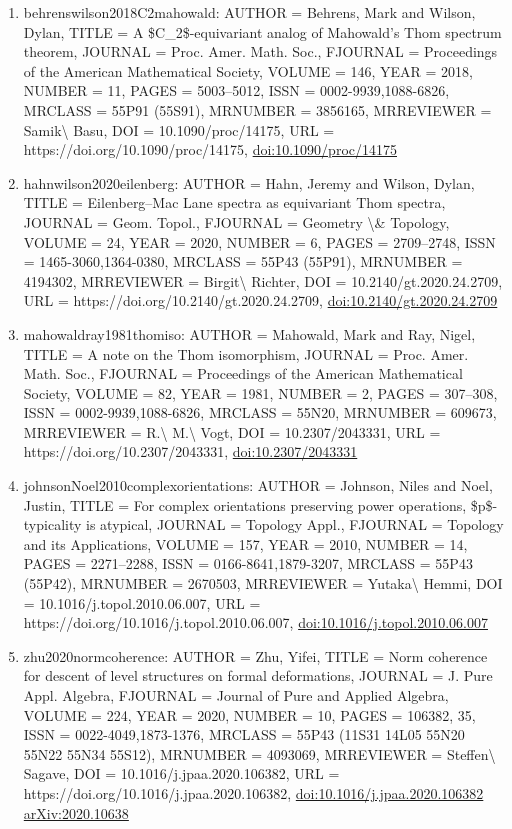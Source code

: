 \documentclass[11pt]{article}
\begin{document}
\begin{enumerate}[leftmargin=*]
  \item behrenswilson2018C2mahowald: AUTHOR = Behrens, Mark and Wilson, Dylan, TITLE = A \$C\_2\$-equivariant analog of Mahowald's Thom spectrum theorem, JOURNAL = Proc. Amer. Math. Soc., FJOURNAL = Proceedings of the American Mathematical Society, VOLUME = 146, YEAR = 2018, NUMBER = 11, PAGES = 5003--5012, ISSN = 0002-9939,1088-6826, MRCLASS = 55P91 (55S91), MRNUMBER = 3856165, MRREVIEWER = Samik\textbackslash{} Basu, DOI = 10.1090/proc/14175, URL = https://doi.org/10.1090/proc/14175, \href{https://doi.org/10.1090/proc/14175}{doi:10.1090/proc/14175}
  \item hahnwilson2020eilenberg: AUTHOR = Hahn, Jeremy and Wilson, Dylan, TITLE = Eilenberg--Mac Lane spectra as equivariant Thom spectra, JOURNAL = Geom. Topol., FJOURNAL = Geometry \textbackslash{}\& Topology, VOLUME = 24, YEAR = 2020, NUMBER = 6, PAGES = 2709--2748, ISSN = 1465-3060,1364-0380, MRCLASS = 55P43 (55P91), MRNUMBER = 4194302, MRREVIEWER = Birgit\textbackslash{} Richter, DOI = 10.2140/gt.2020.24.2709, URL = https://doi.org/10.2140/gt.2020.24.2709, \href{https://doi.org/10.2140/gt.2020.24.2709}{doi:10.2140/gt.2020.24.2709}
  \item mahowaldray1981thomiso: AUTHOR = Mahowald, Mark and Ray, Nigel, TITLE = A note on the Thom isomorphism, JOURNAL = Proc. Amer. Math. Soc., FJOURNAL = Proceedings of the American Mathematical Society, VOLUME = 82, YEAR = 1981, NUMBER = 2, PAGES = 307--308, ISSN = 0002-9939,1088-6826, MRCLASS = 55N20, MRNUMBER = 609673, MRREVIEWER = R.\textbackslash{} M.\textbackslash{} Vogt, DOI = 10.2307/2043331, URL = https://doi.org/10.2307/2043331, \href{https://doi.org/10.2307/2043331}{doi:10.2307/2043331}
  \item johnsonNoel2010complexorientations: AUTHOR = Johnson, Niles and Noel, Justin, TITLE = For complex orientations preserving power operations, \$p\$-typicality is atypical, JOURNAL = Topology Appl., FJOURNAL = Topology and its Applications, VOLUME = 157, YEAR = 2010, NUMBER = 14, PAGES = 2271--2288, ISSN = 0166-8641,1879-3207, MRCLASS = 55P43 (55P42), MRNUMBER = 2670503, MRREVIEWER = Yutaka\textbackslash{} Hemmi, DOI = 10.1016/j.topol.2010.06.007, URL = https://doi.org/10.1016/j.topol.2010.06.007, \href{https://doi.org/10.1016/j.topol.2010.06.007}{doi:10.1016/j.topol.2010.06.007}
  \item zhu2020normcoherence: AUTHOR = Zhu, Yifei, TITLE = Norm coherence for descent of level structures on formal deformations, JOURNAL = J. Pure Appl. Algebra, FJOURNAL = Journal of Pure and Applied Algebra, VOLUME = 224, YEAR = 2020, NUMBER = 10, PAGES = 106382, 35, ISSN = 0022-4049,1873-1376, MRCLASS = 55P43 (11S31 14L05 55N20 55N22 55N34 55S12), MRNUMBER = 4093069, MRREVIEWER = Steffen\textbackslash{} Sagave, DOI = 10.1016/j.jpaa.2020.106382, URL = https://doi.org/10.1016/j.jpaa.2020.106382, \href{https://doi.org/10.1016/j.jpaa.2020.106382}{doi:10.1016/j.jpaa.2020.106382} \href{https://arxiv.org/abs/2020.10638}{arXiv:2020.10638}

\end{enumerate}
\end{document}

